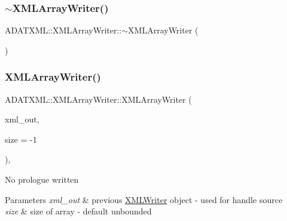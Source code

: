 \subsubsection{\texorpdfstring{$\sim$XMLArrayWriter()}{~XMLArrayWriter()}\hspace{0.1cm}{\footnotesize\ttfamily [2/3]}}
{\footnotesize\ttfamily A\+D\+A\+T\+X\+M\+L\+::\+X\+M\+L\+Array\+Writer\+::$\sim$\+X\+M\+L\+Array\+Writer (\begin{DoxyParamCaption}{ }\end{DoxyParamCaption})}

\mbox{\label{classADATXML_1_1XMLArrayWriter_a51816af0342b997945b0d21e4ba30c5d}} 
\subsubsection{\texorpdfstring{XMLArrayWriter()}{XMLArrayWriter()}\hspace{0.1cm}{\footnotesize\ttfamily [3/3]}}
{\footnotesize\ttfamily A\+D\+A\+T\+X\+M\+L\+::\+X\+M\+L\+Array\+Writer\+::\+X\+M\+L\+Array\+Writer (\begin{DoxyParamCaption}\item[{\mbox{\hyperlink{classADATXML_1_1XMLWriter}{X\+M\+L\+Writer}} \&}]{xml\+\_\+out,  }\item[{int}]{size = {\ttfamily -\/1} }\end{DoxyParamCaption})\hspace{0.3cm}{\ttfamily [inline]}, {\ttfamily [explicit]}}

No prologue written 
\begin{DoxyParams}{Parameters}
{\em xml\+\_\+out} & previous \mbox{\hyperlink{classADATXML_1_1XMLWriter}{X\+M\+L\+Writer}} object -\/ used for handle source \\
\hline
{\em size} & size of array -\/ default unbounded \\
\hline
\end{DoxyParams}
\mbox{\label{classADATXML_1_1XMLArrayWriter_ac1e9df12a7df4c52d6026c3b814abf65}} 
